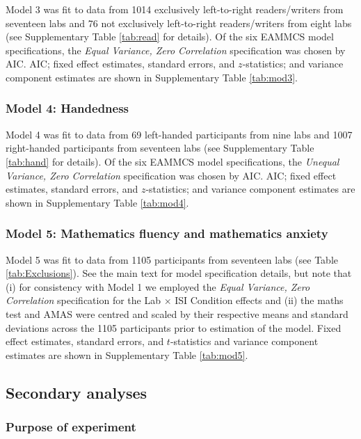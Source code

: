 \documentclass[A4paper,man,floatsintext]{apa6}
\theoremstyle{definition}
\theoremstyle{definition}
\theoremstyle{definition}
\theoremstyle{remark}
\begin{document}
\begin{appendix}
Model 3 was fit to data from 1014 exclusively left-to-right
readers/writers from seventeen labs and 76 not exclusively left-to-right
readers/writers from eight labs (see Supplementary Table \ref{tab:read}
for details). Of the six EAMMCS model specifications, the \emph{Equal
Variance, Zero Correlation} specification was chosen by AIC. AIC; fixed
effect estimates, standard errors, and \(z\)-statistics; and variance
component estimates are shown in Supplementary Table \ref{tab:mod3}.

\subsubsection{Model 4: Handedness}\label{model-4-handedness}

Model 4 was fit to data from 69 left-handed participants from nine labs
and 1007 right-handed participants from seventeen labs (see
Supplementary Table \ref{tab:hand} for details). Of the six EAMMCS model
specifications, the \emph{Unequal Variance, Zero Correlation}
specification was chosen by AIC. AIC; fixed effect estimates, standard
errors, and \(z\)-statistics; and variance component estimates are shown
in Supplementary Table \ref{tab:mod4}.

\subsubsection{Model 5: Mathematics fluency and mathematics
anxiety}\label{model-5-mathematics-fluency-and-mathematics-anxiety}

Model 5 was fit to data from 1105 participants from seventeen labs (see
Table \ref{tab:Exclusions}). See the main text for model specification
details, but note that (i) for consistency with Model 1 we employed the
\emph{Equal Variance, Zero Correlation} specification for the Lab
\(\times\) ISI Condition effects and (ii) the maths test and AMAS were
centred and scaled by their respective means and standard deviations
across the 1105 participants prior to estimation of the model. Fixed
effect estimates, standard errors, and \(t\)-statistics and variance
component estimates are shown in Supplementary Table \ref{tab:mod5}.

\subsection{Secondary analyses}\label{secondary-analyses}

\subsubsection{Purpose of experiment}\label{purpose-of-experiment}


\end{appendix}
\end{document}
